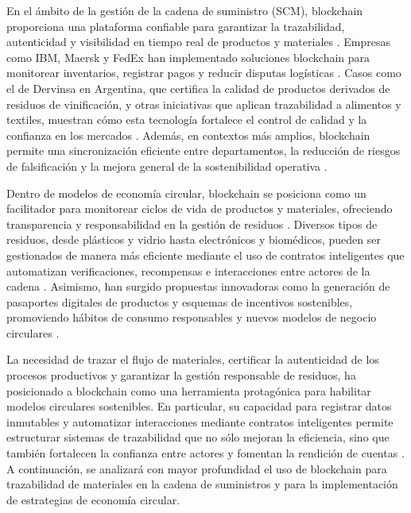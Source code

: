 En el ámbito de la gestión de la cadena de suministro (SCM), blockchain proporciona una plataforma confiable para garantizar la trazabilidad, autenticidad y visibilidad en tiempo real de productos y materiales \cite{torres2022tendencias, sharabati2024blockchain}. Empresas como IBM, Maersk y FedEx han implementado soluciones blockchain para monitorear inventarios, registrar pagos y reducir disputas logísticas \cite{tripathi2023comprehensive}. Casos como el de Dervinsa en Argentina, que certifica la calidad de productos derivados de residuos de vinificación, y otras iniciativas que aplican trazabilidad a alimentos y textiles, muestran cómo esta tecnología fortalece el control de calidad y la confianza en los mercados \cite{bartolomeo2020introduccion}. Además, en contextos más amplios, blockchain permite una sincronización eficiente entre departamentos, la reducción de riesgos de falsificación y la mejora general de la sostenibilidad operativa \cite{sunny2022systematic}.

Dentro de modelos de economía circular, blockchain se posiciona como un facilitador para monitorear ciclos de vida de productos y materiales, ofreciendo transparencia y responsabilidad en la gestión de residuos \cite{bulkowska2023implementation, baralla2023waste}. Diversos tipos de residuos, desde plásticos y vidrio hasta electrónicos y biomédicos, pueden ser gestionados de manera más eficiente mediante el uso de contratos inteligentes que automatizan verificaciones, recompensas e interacciones entre actores de la cadena \cite{baralla2023waste}. Asimismo, han surgido propuestas innovadoras como la generación de pasaportes digitales de productos y esquemas de incentivos sostenibles, promoviendo hábitos de consumo responsables y nuevos modelos de negocio circulares \cite{baralla2023waste}.

La necesidad de trazar el flujo de materiales, certificar la autenticidad de los procesos productivos y garantizar la gestión responsable de residuos, ha posicionado a blockchain como una herramienta protagónica para habilitar modelos circulares sostenibles. En particular, su capacidad para registrar datos inmutables y automatizar interacciones mediante contratos inteligentes permite estructurar sistemas de trazabilidad que no sólo mejoran la eficiencia, sino que también fortalecen la confianza entre actores y fomentan la rendición de cuentas \cite{sharabati2024blockchain, rejeb2023role}. A continuación, se analizará con mayor profundidad el uso de blockchain para trazabilidad de materiales en la cadena de suministros y para la implementación de estrategias de economía circular.

